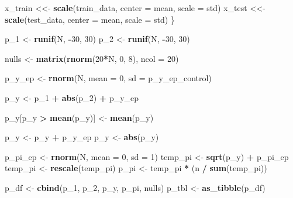 \documentclass[12pt,twoside]{reedthesis}
\newenvironment{Shaded}{\begin{snugshade}}{\end{snugshade}}
\newcommand{\KeywordTok}[1]{\textcolor[rgb]{0.13,0.29,0.53}{\textbf{#1}}}
\newcommand{\DataTypeTok}[1]{\textcolor[rgb]{0.13,0.29,0.53}{#1}}
\newcommand{\DecValTok}[1]{\textcolor[rgb]{0.00,0.00,0.81}{#1}}
\newcommand{\StringTok}[1]{\textcolor[rgb]{0.31,0.60,0.02}{#1}}
\newcommand{\OperatorTok}[1]{\textcolor[rgb]{0.81,0.36,0.00}{\textbf{#1}}}
\newcommand{\NormalTok}[1]{#1}
\begin{document}
\begin{Shaded}
\begin{Highlighting}[]
{\NormalTok{  x_train <<-}\StringTok{ }\KeywordTok{scale}\NormalTok{(train_data, }\DataTypeTok{center =}\NormalTok{ mean, }\DataTypeTok{scale =}\NormalTok{ std)}
\NormalTok{  x_test <<-}\StringTok{ }\KeywordTok{scale}\NormalTok{(test_data, }\DataTypeTok{center =}\NormalTok{ mean, }\DataTypeTok{scale =}\NormalTok{ std)}
\NormalTok{\}}

\NormalTok{p_}\DecValTok{1}\NormalTok{ <-}\StringTok{ }\KeywordTok{runif}\NormalTok{(N, }\OperatorTok{-}\DecValTok{30}\NormalTok{, }\DecValTok{30}\NormalTok{)}
\NormalTok{p_}\DecValTok{2}\NormalTok{ <-}\StringTok{ }\KeywordTok{runif}\NormalTok{(N, }\OperatorTok{-}\DecValTok{30}\NormalTok{, }\DecValTok{30}\NormalTok{)}

\NormalTok{nulls <-}\StringTok{ }\KeywordTok{matrix}\NormalTok{(}\KeywordTok{rnorm}\NormalTok{(}\DecValTok{20}\OperatorTok{*}\NormalTok{N, }\DecValTok{0}\NormalTok{, }\DecValTok{8}\NormalTok{), }\DataTypeTok{ncol =} \DecValTok{20}\NormalTok{)}

\NormalTok{p_y_ep <-}\StringTok{ }\KeywordTok{rnorm}\NormalTok{(N, }\DataTypeTok{mean =} \DecValTok{0}\NormalTok{, }\DataTypeTok{sd =}\NormalTok{ p_y_ep_control)}

\NormalTok{p_y <-}\StringTok{ }\NormalTok{p_}\DecValTok{1} \OperatorTok{+}\StringTok{ }\KeywordTok{abs}\NormalTok{(p_}\DecValTok{2}\NormalTok{) }\OperatorTok{+}\StringTok{ }\NormalTok{p_y_ep }

\NormalTok{p_y[p_y }\OperatorTok{>}\StringTok{ }\KeywordTok{mean}\NormalTok{(p_y)] <-}\StringTok{ }\KeywordTok{mean}\NormalTok{(p_y)}

\NormalTok{p_y <-}\StringTok{ }\NormalTok{p_y }\OperatorTok{+}\StringTok{ }\NormalTok{p_y_ep}
\NormalTok{p_y <-}\StringTok{ }\KeywordTok{abs}\NormalTok{(p_y)}

\NormalTok{p_pi_ep <-}\StringTok{ }\KeywordTok{rnorm}\NormalTok{(N, }\DataTypeTok{mean =} \DecValTok{0}\NormalTok{, }\DataTypeTok{sd =} \DecValTok{1}\NormalTok{)}
\NormalTok{temp_pi <-}\StringTok{ }\KeywordTok{sqrt}\NormalTok{(p_y) }\OperatorTok{+}\StringTok{ }\NormalTok{p_pi_ep}
\NormalTok{temp_pi <-}\StringTok{ }\KeywordTok{rescale}\NormalTok{(temp_pi)}
\NormalTok{p_pi <-}\StringTok{ }\NormalTok{temp_pi }\OperatorTok{*}\StringTok{ }\NormalTok{(n }\OperatorTok{/}\StringTok{ }\KeywordTok{sum}\NormalTok{(temp_pi))}

\NormalTok{p_df <-}\StringTok{ }\KeywordTok{cbind}\NormalTok{(p_}\DecValTok{1}\NormalTok{, p_}\DecValTok{2}\NormalTok{, p_y, p_pi, nulls)}
\NormalTok{p_tbl <-}\StringTok{ }\KeywordTok{as_tibble}\NormalTok{(p_df)}

}
\end{Highlighting}
\end{Shaded}
\end{document}
